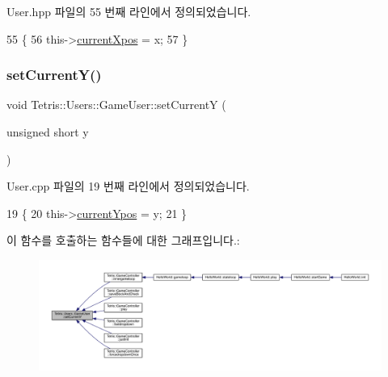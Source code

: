 User.\+hpp 파일의 55 번째 라인에서 정의되었습니다.


\begin{DoxyCode}
55                                                   \{
56                     this->\hyperlink{class_tetris_1_1_users_1_1_game_user_a3edcace8f88494f9cee4ba99ba9b6c87}{currentXpos} = x;
57                 \}
\end{DoxyCode}
\mbox{\label{class_tetris_1_1_users_1_1_game_user_aeedbe521004c22018b73a509e99f7d81}} 
\subsubsection{\texorpdfstring{set\+Current\+Y()}{setCurrentY()}\hspace{0.1cm}{\footnotesize\ttfamily [1/2]}}
{\footnotesize\ttfamily void Tetris\+::\+Users\+::\+Game\+User\+::set\+CurrentY (\begin{DoxyParamCaption}\item[{unsigned short}]{y }\end{DoxyParamCaption})}



User.\+cpp 파일의 19 번째 라인에서 정의되었습니다.


\begin{DoxyCode}
19                                                           \{
20                     this->\hyperlink{class_tetris_1_1_users_1_1_game_user_ac1d5e4a4f73eb8502faae95d7958d83e}{currentYpos} = y;
21                 \}
\end{DoxyCode}
이 함수를 호출하는 함수들에 대한 그래프입니다.\+:
\nopagebreak
\begin{figure}[H]
\begin{center}
\leavevmode
\includegraphics[width=350pt]{d8/d9a/class_tetris_1_1_users_1_1_game_user_aeedbe521004c22018b73a509e99f7d81_icgraph}
\end{center}
\end{figure}
\mbox{\label{class_tetris_1_1_users_1_1_game_user_aeedbe521004c22018b73a509e99f7d81}} 
